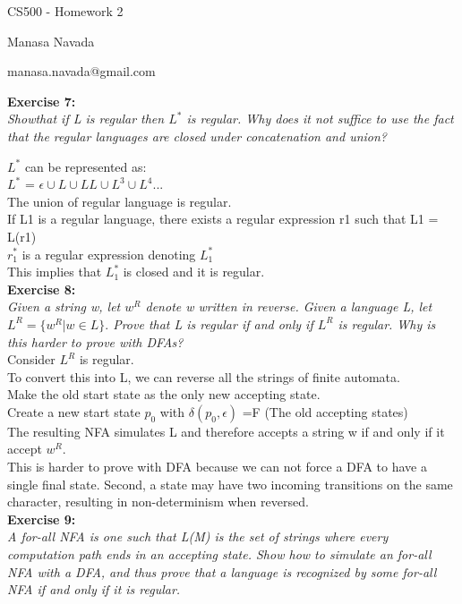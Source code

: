 \documentclass[11pt]{article}
\begin{document}
\centerline{CS500 - Homework 2} 

\centerline{Manasa Navada} 

\centerline{manasa.navada@gmail.com} 
\null

\begin{flushleft}
\textbf{Exercise 7:} \\
\textit{Showthat if L is regular then $L^*$ is regular. Why does it not suffice to use the fact that the regular languages are closed under concatenation and union?}

\null
$L^*$ can be represented as: \\
$L^*$ = $\epsilon \cup L \cup LL \cup L^3 \cup L^4$...\\
The union of regular language is regular.\\
\null
If L1 is a regular language, there exists a regular expression r1 such that L1 = L(r1)\\
$r_1^*$ is a regular expression denoting $L_1^*$\\
This implies that $L_1^*$ is closed and it is regular. \\ 
\null
\textbf{Exercise 8:} \\
\textit{Given a string w, let $w^R$ denote w written in reverse. Given a language L, let $L^R = \{w^R | w \in L \}.$ Prove that L is regular if and only if $L^R$ is regular. Why is this harder to prove with DFAs?}\\
\null
Consider $L^R$ is regular.\\
To convert this into L, we can reverse all the strings of finite automata.\\
Make the old start state as the only new accepting state.\\
Create a new start state $p_0$ with $\delta(p_0, \epsilon)$ =F (The old accepting states)\\
The resulting NFA simulates L and therefore accepts a string w if and only if it accept $w^R$.\\
\null
This is harder to prove with DFA because we can not force a DFA to have a single final state. Second, a state may have two incoming transitions on the same character, resulting in non-determinism when reversed.\\
\null
\textbf{Exercise 9:} \\
\textit{A for-all NFA is one such that L(M) is the set of strings where every computation path ends in an accepting state. Show how to simulate an for-all NFA with a DFA, and thus prove that a language is recognized by some
for-all NFA if and only if it is regular.}\\

\end{flushleft}
\end{document}
